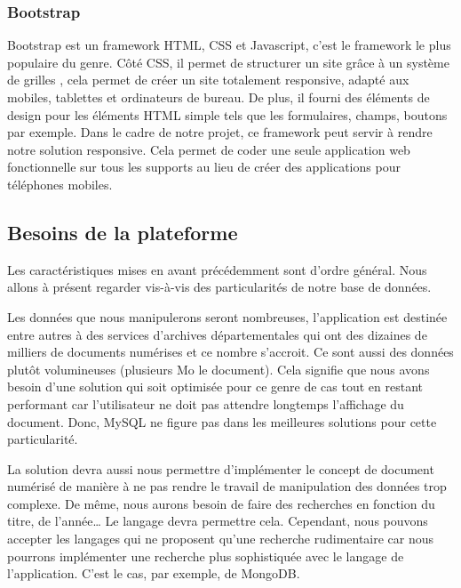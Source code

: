         \subsubsection{Bootstrap}
        \label{subsubsec:bootstrap}
        Bootstrap est un framework HTML, CSS et Javascript, c’est le framework le plus populaire du genre.
        Côté CSS, il permet de structurer un site grâce à un système de grilles , cela permet de créer
        un site totalement responsive, adapté aux mobiles, tablettes et ordinateurs de bureau. De plus,
        il fourni des éléments de design pour les éléments HTML simple tels que les formulaires, champs,
        boutons par exemple. Dans le cadre de notre projet, ce framework peut servir à rendre notre solution responsive.
        Cela permet de coder une seule application web fonctionnelle sur tous les supports au lieu de créer
        des applications pour téléphones mobiles.

    \subsection{Besoins de la plateforme}
    \label{subsec:besoinplateforme}
    Les caractéristiques mises en avant précédemment sont d’ordre général. Nous allons à présent
    regarder vis-à-vis des particularités de notre base de données.

    Les données que nous manipulerons seront nombreuses, l’application est destinée entre autres
    à des services d’archives départementales qui ont des dizaines de milliers de documents numérises
    et ce nombre s’accroit. Ce sont aussi des données plutôt volumineuses (plusieurs Mo le document).
    Cela signifie que nous avons besoin d’une solution qui soit optimisée pour ce genre de cas tout
    en restant performant car l’utilisateur ne doit pas attendre longtemps l’affichage du document.
    Donc, MySQL ne figure pas dans les meilleures solutions pour cette particularité.

    La solution devra aussi nous permettre d’implémenter le concept de document numérisé de manière
    à ne pas rendre le travail de manipulation des données trop complexe. De même, nous aurons besoin
    de faire des recherches en fonction du titre, de l’année… Le langage devra permettre cela.
    Cependant, nous pouvons accepter les langages qui ne proposent qu’une recherche rudimentaire
    car nous pourrons implémenter une recherche plus sophistiquée avec le langage de l’application.
    C’est le cas, par exemple, de MongoDB.

